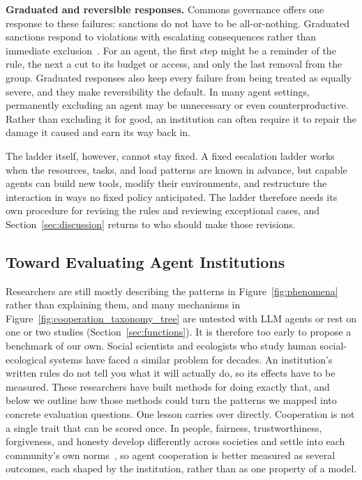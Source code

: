 \documentclass[runningheads]{llncs}
\begin{document}
\textbf{Graduated and reversible responses.} Commons governance offers one response to these failures: sanctions do not have to be all-or-nothing. Graduated sanctions respond to violations with escalating consequences rather than immediate exclusion~\mbox{\citep{ostromGoverningCommonsEvolution1990}}. For an agent, the first step might be a reminder of the rule, the next a cut to its budget or access, and only the last removal from the group. Graduated responses also keep every failure from being treated as equally severe, and they make reversibility the default. In many agent settings, permanently excluding an agent may be unnecessary or even counterproductive. Rather than excluding it for good, an institution can often require it to repair the damage it caused and earn its way back in.

The ladder itself, however, cannot stay fixed. A fixed escalation ladder works when the resources, tasks, and load patterns are known in advance, but capable agents can build new tools, modify their environments, and restructure the interaction in ways no fixed policy anticipated. The ladder therefore needs its own procedure for revising the rules and reviewing exceptional cases, and Section~\mbox{\ref{sec:discussion}} returns to who should make those revisions.

\subsection{Toward Evaluating Agent Institutions}\label{sec:evaluation}
\label{sec:design_dim}

Researchers are still mostly describing the patterns in Figure~\mbox{\ref{fig:phenomena}} rather than explaining them, and many mechanisms in Figure~\mbox{\ref{fig:cooperation_taxonomy_tree}} are untested with LLM agents or rest on one or two studies (Section~\mbox{\ref{sec:functions}}). It is therefore too early to propose a benchmark of our own. Social scientists and ecologists who study human social-ecological systems have faced a similar problem for decades. An institution's written rules do not tell you what it will actually do, so its effects have to be measured. These researchers have built methods for doing exactly that, and below we outline how those methods could turn the patterns we mapped into concrete evaluation questions. One lesson carries over directly. Cooperation is not a single trait that can be scored once. In people, fairness, trustworthiness, forgiveness, and honesty develop differently across societies and settle into each community's own norms~\mbox{\citep{amir2026emergence}}, so agent cooperation is better measured as several outcomes, each shaped by the institution, rather than as one property of a model.
\end{document}

